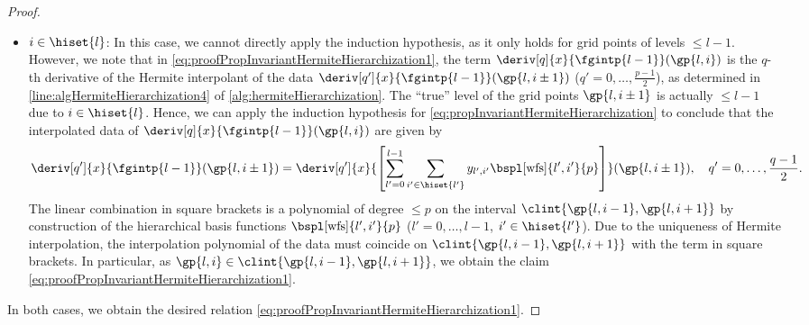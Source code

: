 \begin{proof}
\begin{itemize}
    \item
    ${i \in \hiset{l}}$:
    In this case, we cannot directly apply the induction hypothesis,
    as it only holds for grid points of levels $\le l - 1$.
    However, we note that in
    \eqref{eq:proofPropInvariantHermiteHierarchization1},
    the term $\deriv[q]{x}{\fgintp{l-1}}(\gp{l,i})$
    is the $q$-th derivative of the Hermite interpolant of
    the data $\deriv[q']{x}{\fgintp{l-1}}(\gp{l,i\pm1})$
    ($q' = 0, \dotsc, \frac{p-1}{2}$),
    as determined in \cref{line:algHermiteHierarchization4}
    of \cref{alg:hermiteHierarchization}.
    The ``true'' level of the grid points $\gp{l,i\pm1}$ is
    actually $\le l - 1$ due to $i \in \hiset{l}$.
    Hence, we can apply the induction hypothesis
    for \cref{eq:propInvariantHermiteHierarchization}
    to conclude that the interpolated data of
    $\deriv[q]{x}{\fgintp{l-1}}(\gp{l,i})$ are given by
    \begin{equation}
      \deriv[q']{x}{\fgintp{l-1}}(\gp{l,i\pm1})
      = \deriv[q']{x}{
        \bracket*{
          \sum_{l'=0}^{l-1} \sum_{i' \in \hiset{l'}}
          \linout{l',i'} \bspl[\wfs]{l',i'}{p}
        }
      }(\gp{l,i\pm1}),\quad
      q' = 0, \dotsc, \frac{q-1}{2}.
    \end{equation}
    The linear combination in square brackets
    is a polynomial of degree $\le p$ on the interval
    $\clint{\gp{l,i-1}, \gp{l,i+1}}$
    by construction of the hierarchical basis functions
    $\bspl[\wfs]{l',i'}{p}$ ($l' = 0, \dotsc, l - 1$, $i' \in \hiset{l'}$).
    Due to the uniqueness of Hermite interpolation,
    the interpolation polynomial of the data must
    coincide on $\clint{\gp{l,i-1}, \gp{l,i+1}}$
    with the term in square brackets.
    In particular, as $\gp{l,i} \in \clint{\gp{l,i-1}, \gp{l,i+1}}$,
    we obtain the claim \eqref{eq:proofPropInvariantHermiteHierarchization1}.
  \end{itemize}
  In both cases, we obtain the desired relation
  \eqref{eq:proofPropInvariantHermiteHierarchization1}.
\end{proof}


